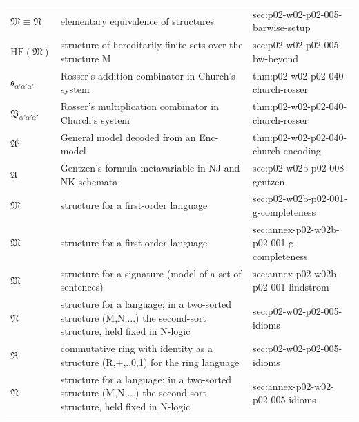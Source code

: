 \begin{longtable}{@{}p{}p{}p{}@{}}
\(\mathfrak M\equiv\mathfrak N\) & elementary equivalence of structures & sec:\allowbreak{}p02-\allowbreak{}w02-\allowbreak{}p02-\allowbreak{}005-\allowbreak{}barwise-\allowbreak{}setup \\
\(\mathrm{HF}(\mathfrak M)\) & structure of hereditarily finite sets over the structure M & sec:\allowbreak{}p02-\allowbreak{}w02-\allowbreak{}p02-\allowbreak{}005-\allowbreak{}bw-\allowbreak{}beyond \\
\(\mathfrak s_{\alpha'\alpha'\alpha'}\) & Rosser's addition combinator in Church's system & thm:\allowbreak{}p02-\allowbreak{}w02-\allowbreak{}p02-\allowbreak{}040-\allowbreak{}church-\allowbreak{}rosser \\
\(\mathfrak B_{\alpha'\alpha'\alpha'}\) & Rosser's multiplication combinator in Church's system & thm:\allowbreak{}p02-\allowbreak{}w02-\allowbreak{}p02-\allowbreak{}040-\allowbreak{}church-\allowbreak{}rosser \\
\(\mathfrak A^\natural\) & General model decoded from an Enc-model & thm:\allowbreak{}p02-\allowbreak{}w02-\allowbreak{}p02-\allowbreak{}040-\allowbreak{}church-\allowbreak{}encoding \\
\(\mathfrak A\) & Gentzen's formula metavariable in NJ and NK schemata & sec:\allowbreak{}p02-\allowbreak{}w02b-\allowbreak{}p02-\allowbreak{}008-\allowbreak{}gentzen \\
\(\mathfrak M\) & structure for a first-order language & sec:\allowbreak{}p02-\allowbreak{}w02b-\allowbreak{}p02-\allowbreak{}001-\allowbreak{}g-\allowbreak{}completeness \\
\(\mathfrak M\) & structure for a first-order language & sec:\allowbreak{}annex-\allowbreak{}p02-\allowbreak{}w02b-\allowbreak{}p02-\allowbreak{}001-\allowbreak{}g-\allowbreak{}completeness \\
\(\mathfrak M\) & structure for a signature (model of a set of sentences) & sec:\allowbreak{}annex-\allowbreak{}p02-\allowbreak{}w02b-\allowbreak{}p02-\allowbreak{}001-\allowbreak{}lindstrom \\
\(\mathfrak N\) & structure for a language; in a two-sorted structure (M,N,...) the second-sort structure, held fixed in N-logic & sec:\allowbreak{}p02-\allowbreak{}w02-\allowbreak{}p02-\allowbreak{}005-\allowbreak{}idioms \\
\(\mathfrak R\) & commutative ring with identity as a structure (R,+,.,0,1) for the ring language & sec:\allowbreak{}p02-\allowbreak{}w02-\allowbreak{}p02-\allowbreak{}005-\allowbreak{}idioms \\
\(\mathfrak N\) & structure for a language; in a two-sorted structure (M,N,...) the second-sort structure, held fixed in N-logic & sec:\allowbreak{}annex-\allowbreak{}p02-\allowbreak{}w02-\allowbreak{}p02-\allowbreak{}005-\allowbreak{}idioms \\

\end{longtable}
